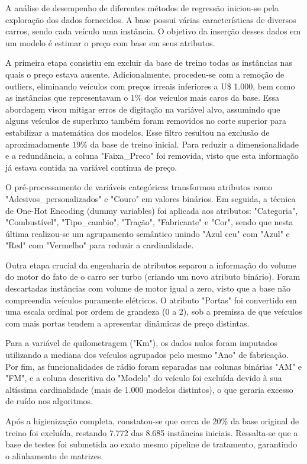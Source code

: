 \documentclass[conference]{IEEEtran}
\begin{document}
		A análise de desempenho de diferentes métodos de regressão iniciou-se pela exploração dos dados fornecidos. A base possui várias características de diversos carros, sendo cada veículo uma instância. O objetivo da inserção desses dados em um modelo é estimar o preço com base em seus atributos.

		A primeira etapa consistiu em excluir da base de treino todas as instâncias nas quais o preço estava ausente. Adicionalmente, procedeu-se com a remoção de outliers, eliminando veículos com preços irreais inferiores a U\$ 1.000, bem como as instâncias que representavam o 1\% dos veículos mais caros da base. Essa abordagem visou mitigar erros de digitação na variável alvo, assumindo que alguns veículos de superluxo também foram removidos no corte superior para estabilizar a matemática dos modelos. Esse filtro resultou na exclusão de aproximadamente 19\% da base de treino inicial. Para reduzir a dimensionalidade e a redundância, a coluna "Faixa\_Preco" foi removida, visto que esta informação já estava contida na variável contínua de preço.

		O pré-processamento de variáveis categóricas transformou atributos como "Adesivos\_personalizados" e "Couro" em valores binários. Em seguida, a técnica de One-Hot Encoding (dummy variables) foi aplicada aos atributos: "Categoria", "Combustível", "Tipo\_cambio", "Tração", "Fabricante" e "Cor", sendo que nesta última realizou-se um agrupamento semântico unindo "Azul ceu" com "Azul" e "Red" com "Vermelho" para reduzir a cardinalidade.

		Outra etapa crucial da engenharia de atributos separou a informação do volume do motor do fato de o carro ser turbo (criando um novo atributo binário). Foram descartadas instâncias com volume de motor igual a zero, visto que a base não compreendia veículos puramente elétricos. O atributo "Portas" foi convertido em uma escala ordinal por ordem de grandeza (0 a 2), sob a premissa de que veículos com mais portas tendem a apresentar dinâmicas de preço distintas.

		Para a variável de quilometragem ("Km"), os dados nulos foram imputados utilizando a mediana dos veículos agrupados pelo mesmo "Ano" de fabricação. Por fim, as funcionalidades de rádio foram separadas nas colunas binárias "AM" e "FM", e a coluna descritiva do "Modelo" do veículo foi excluída devido à sua altíssima cardinalidade (mais de 1.000 modelos distintos), o que geraria excesso de ruído nos algoritmos.

		Após a higienização completa, constatou-se que cerca de 20\% da base original de treino foi excluída, restando 7.772 das 8.685 instâncias iniciais. Ressalta-se que a base de testes foi submetida ao exato mesmo pipeline de tratamento, garantindo o alinhamento de matrizes.
\end{document}

